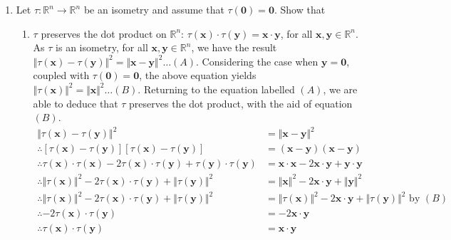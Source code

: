 \documentclass[a4paper,11pt]{article}
\newcommand{\ds}{\displaystyle}
\begin{document}
{{\begin{enumerate}[leftmargin=*]
	\item Let $\ds{\tau : \mathbb{R}^n \rightarrow \mathbb{R}^n}$ be an isometry and assume that $\ds{\tau(\mathbf{0}) = \mathbf{0}}$. Show that
		\begin{enumerate}
			\item $\ds{\tau}$ preserves the dot product on $\ds{\mathbb{R}^n}$: $\ds{\tau(\mathbf{x}) \cdot \tau(\mathbf{y}) = \mathbf{x} \cdot \mathbf{y}}$, for all $\ds{\mathbf{x}, \mathbf{y} \in \mathbb{R}^n}$.
				\bigbreak
				As $\ds{\tau}$ is an isometry, for all $\ds{\mathbf{x}, \mathbf{y} \in \mathbb{R}^n}$, we have the result $\ds{{\Vert \tau(\mathbf{x}) - \tau(\mathbf{y}) \Vert}^2 = {\Vert \mathbf{x} - \mathbf{y} \Vert}^2 \dots (A)}$. Considering the case when $\ds{\mathbf{y} = \mathbf{0}}$, coupled with $\ds{\tau(\mathbf{0}) = \mathbf{0}}$, the above equation yields \\ $\ds{{\Vert \tau(\mathbf{x}) \Vert}^2 = {\Vert \mathbf{x} \Vert}^2 \dots (B)}$. Returning to the equation labelled $\ds{(A)}$, we are able to deduce that $\ds{\tau}$ preserves the dot product, with the aid of equation $\ds{(B)}$.
				\begin{align*}
					{\Vert \tau(\mathbf{x}) - \tau(\mathbf{y}) \Vert}^2 & = {\Vert \mathbf{x} - \mathbf{y} \Vert}^2\\
					\therefore [\tau(\mathbf{x}) - \tau(\mathbf{y})][\tau(\mathbf{x}) - \tau(\mathbf{y})] & = (\mathbf{x} - \mathbf{y})(\mathbf{x} - \mathbf{y})\\
					\therefore \tau(\mathbf{x})\cdot\tau(\mathbf{x}) - 2\tau(\mathbf{x})\cdot\tau(\mathbf{y}) + \tau(\mathbf{y})\cdot\tau(\mathbf{y}) & = \mathbf{x}\cdot\mathbf{x} - 2\mathbf{x}\cdot\mathbf{y} + \mathbf{y}\cdot\mathbf{y}\\
					\therefore {\Vert \tau(\mathbf{x}) \Vert}^2 - 2\tau(\mathbf{x})\cdot\tau(\mathbf{y}) + {\Vert \tau(\mathbf{y}) \Vert}^2 & = {\Vert \mathbf{x} \Vert}^2 - 2\mathbf{x}\cdot\mathbf{y} + {\Vert \mathbf{y} \Vert}^2\\
					\therefore {\Vert \tau(\mathbf{x}) \Vert}^2 - 2\tau(\mathbf{x})\cdot\tau(\mathbf{y}) + {\Vert \tau(\mathbf{y}) \Vert}^2 & = {\Vert \tau(\mathbf{x}) \Vert}^2 - 2\mathbf{x}\cdot\mathbf{y} + {\Vert \tau(\mathbf{y}) \Vert}^2 \text{ by } (B)\\
					\therefore - 2\tau(\mathbf{x})\cdot\tau(\mathbf{y}) & = - 2\mathbf{x}\cdot\mathbf{y}\\
					\therefore \tau(\mathbf{x})\cdot\tau(\mathbf{y}) & = \mathbf{x}\cdot\mathbf{y}\\
				\end{align*}
				

\end{enumerate}
\end{enumerate}}}
\end{document}
